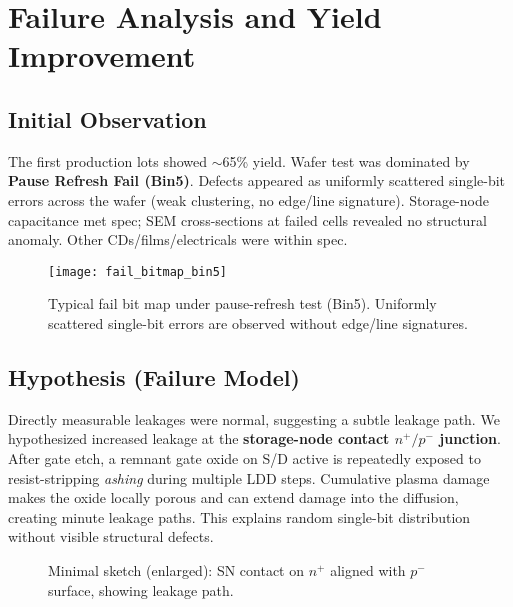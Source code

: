 \section{Failure Analysis and Yield Improvement}

\subsection{Initial Observation}
The first production lots showed $\sim$65\% yield. Wafer test was dominated by \textbf{Pause Refresh Fail (Bin5)}. Defects appeared as uniformly scattered single-bit errors across the wafer (weak clustering, no edge/line signature). Storage-node capacitance met spec; SEM cross-sections at failed cells revealed no structural anomaly. Other CDs/films/electricals were within spec.

\begin{figure}[t]
  \centering
  \texttt{[image: fail\_bitmap\_bin5]}
  \caption{Typical fail bit map under pause-refresh test (Bin5).
  Uniformly scattered single-bit errors are observed without edge/line signatures.}
  \label{fig:fail_bitmap}
\end{figure}

\subsection{Hypothesis (Failure Model)}
Directly measurable leakages were normal, suggesting a subtle leakage path. We hypothesized increased leakage at the \textbf{storage-node contact $n^+/p^-$ junction}. After gate etch, a remnant gate oxide on S/D active is repeatedly exposed to resist-stripping \emph{ashing} during multiple LDD steps. Cumulative plasma damage makes the oxide locally porous and can extend damage into the diffusion, creating minute leakage paths. This explains random single-bit distribution without visible structural defects.

\begin{figure}[t]
  \centering
  \caption{Minimal sketch (enlarged): SN contact on $n^{+}$ aligned with $p^{-}$ surface, showing leakage path.}
  \label{fig:fig2_min}
\end{figure}

